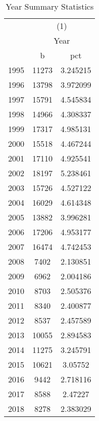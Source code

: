 {
\def\sym#1{\ifmmode^{#1}\else\(^{#1}\)\fi}
\begin{longtable}{l*{1}{cc}}
\caption{Year Summary Statistics}\\
\toprule\endfirsthead\midrule\endhead\midrule\endfoot\endlastfoot
                    &\multicolumn{2}{c}{(1)}  \\
                    &\multicolumn{2}{c}{Year} \\
                    &           b&         pct\\
\midrule
1995                &       11273&    3.245215\\
1996                &       13798&    3.972099\\
1997                &       15791&    4.545834\\
1998                &       14966&    4.308337\\
1999                &       17317&    4.985131\\
2000                &       15518&    4.467244\\
2001                &       17110&    4.925541\\
2002                &       18197&    5.238461\\
2003                &       15726&    4.527122\\
2004                &       16029&    4.614348\\
2005                &       13882&    3.996281\\
2006                &       17206&    4.953177\\
2007                &       16474&    4.742453\\
2008                &        7402&    2.130851\\
2009                &        6962&    2.004186\\
2010                &        8703&    2.505376\\
2011                &        8340&    2.400877\\
2012                &        8537&    2.457589\\
2013                &       10055&    2.894583\\
2014                &       11275&    3.245791\\
2015                &       10621&     3.05752\\
2016                &        9442&    2.718116\\
2017                &        8588&     2.47227\\
2018                &        8278&    2.383029\\

\end{longtable}}
